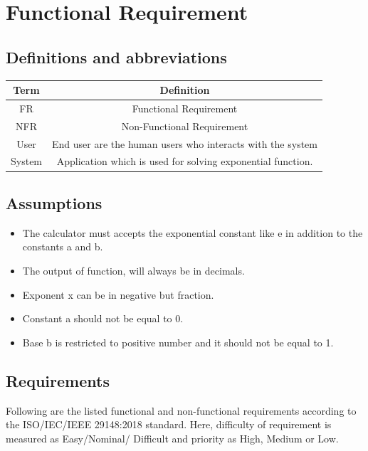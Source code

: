 \documentclass[a4paper,12pt]{report}
\begin{document}
\section{Functional Requirement}
\subsection{Definitions and abbreviations}
\begin{center}
    \begin{tabular}{|c|c|}
         \hline
         Term & Definition \\
         \hline\hline
         FR & Functional Requirement \\
         \hline
         NFR & Non-Functional Requirement \\
         \hline
         User & End user are the human users who interacts with the system \\
         \hline
         System & Application which is used for solving exponential function. \\
         \hline
        \end{tabular}
        \label{tab:xyz}
\end{center}

\subsection{Assumptions}
\begin{itemize}
    \item The calculator must accepts the exponential constant like e in addition to the constants a and b.
    \item The output of function, will always be in decimals.
    \item Exponent x can be in negative but fraction.
    \item Constant a should not be equal to 0.
    \item Base b is restricted to positive number and it should not be equal to 1.


\end{itemize}

\subsection{Requirements}
Following are the listed functional and non-functional requirements according to the ISO/IEC/IEEE 29148:2018 standard.\cite{b13} Here, difficulty of requirement is measured as Easy/Nominal/
Difficult and priority as High, Medium or Low.
\end{document}
